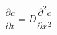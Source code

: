 \documentclass[preview]{standalone}
\begin{document}
\[\frac{\partial c}{\partial t} = D \frac{\partial^2 c}{\partial x^2} \tag{2.5}\]
\end{document}
